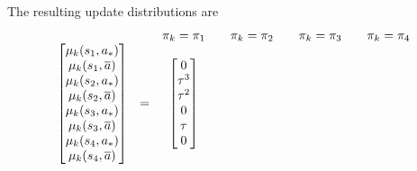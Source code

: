 The resulting update distributions are
\begin{align}
\label{eq: update distribution 4s cycle}
    \begin{array}{lcccccccc}
    & & \pi_k = \pi_1 & & \pi_k = \pi_2 & & \pi_k = \pi_3 & & \pi_k = \pi_4 
    \\
    \begin{bmatrix}
        \mu_k(s_1, {a}_*)
        \\
        \mu_k(s_1, \overline{a})
        \\
        \mu_k(s_2, {a}_*)
        \\
        \mu_k(s_2, \overline{a})
        \\
        \mu_k(s_3, {a}_*)
        \\
        \mu_k(s_3, \overline{a})
        \\
        \mu_k(s_4, {a}_*)
        \\
        \mu_k(s_4, \overline{a})
    \end{bmatrix}
    &
    =
    &
    \begin{bmatrix}
        0
        \\
        \tau^3
        \\
        \tau^2
        \\
        0
        \\
        \tau
        \\
        0
        \\

\end{bmatrix}
\end{array}
\end{align}
